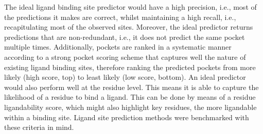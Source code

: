 The ideal ligand binding site predictor would have a high precision, i.e., most of the predictions it makes are correct, whilst maintaining a high recall, i.e., recapitulating most of the observed sites. Moreover, the ideal predictor returns predictions that are non-redundant, i.e., it does not predict the same pocket multiple times. Additionally, pockets are ranked in a systematic manner according to a strong pocket scoring scheme that captures well the nature of existing ligand binding sites, therefore ranking the predicted pockets from more likely (high score, top) to least likely (low score, bottom). An ideal predictor would also perform well at the residue level. This means it is able to capture the likelihood of a residue to bind a ligand. This can be done by means of a residue ligandability score, which might also highlight key residues, the more ligandable within a binding site. Ligand site prediction methods were benchmarked with these criteria in mind.

